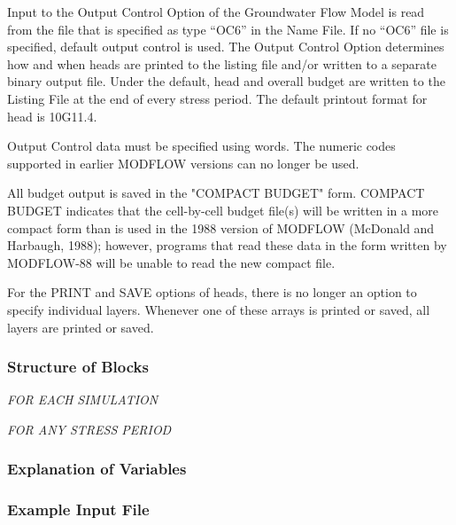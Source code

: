 Input to the Output Control Option of the Groundwater Flow Model is read from the file that is specified as type ``OC6'' in the Name File. If no ``OC6'' file is specified, default output control is used. The Output Control Option determines how and when heads are printed to the listing file and/or written to a separate binary output file.  Under the default, head and overall budget are written to the Listing File at the end of every stress period. The default printout format for head is 10G11.4.

Output Control data must be specified using words.  The numeric codes supported in earlier MODFLOW versions can no longer be used.

All budget output is saved in the "COMPACT BUDGET" form.  COMPACT BUDGET indicates that the cell-by-cell budget file(s) will be written in a more compact form than is used in the 1988 version of MODFLOW (McDonald and Harbaugh, 1988); however, programs that read these data in the form written by MODFLOW-88 will be unable to read the new compact file. 

For the PRINT and SAVE options of heads, there is no longer an option to specify individual layers.  Whenever one of these arrays is printed or saved, all layers are printed or saved.

\vspace{5mm}
\subsubsection{Structure of Blocks}
\vspace{5mm}

\noindent \textit{FOR EACH SIMULATION}

\vspace{5mm}
\noindent \textit{FOR ANY STRESS PERIOD}


\vspace{5mm}
\subsubsection{Explanation of Variables}
\begin{description}

\end{description}

\vspace{5mm}
\subsubsection{Example Input File}

